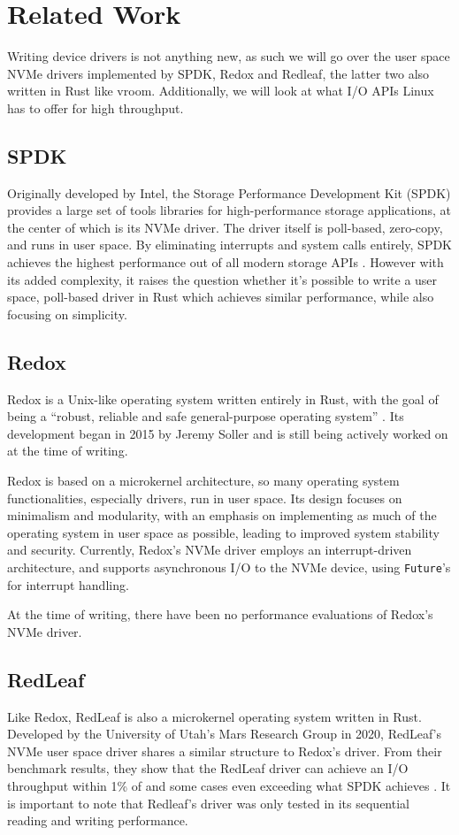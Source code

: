 \chapter{Related Work}\label{chapter:related}
Writing device drivers is not anything new, as such we will go over the user space NVMe drivers implemented by SPDK, Redox and Redleaf, the latter two also written in Rust like vroom. Additionally, we will look at what I/O APIs Linux has to offer for high throughput.

\section{SPDK}
Originally developed by Intel, the Storage Performance Development Kit (SPDK) provides a large set of tools libraries for high-performance storage applications, at the center of which is its NVMe driver. The driver itself is poll-based, zero-copy, and runs in user space. By eliminating interrupts and system calls entirely, SPDK achieves the highest performance out of all modern storage APIs \cite{storage_api}. However with its added complexity, it raises the question whether it's possible to write a user space, poll-based driver in Rust which achieves similar performance, while also focusing on simplicity.

\section{Redox}
Redox is a Unix-like operating system written entirely in Rust, with the goal of being a ``robust, reliable and safe general-purpose operating system'' \cite{redox}. Its development began in 2015 by Jeremy Soller and is still being actively worked on at the time of writing.

Redox is based on a microkernel architecture, so many operating system functionalities, especially drivers, run in user space. Its design focuses on minimalism and modularity, with an emphasis on implementing as much of the operating system in user space as possible, leading to improved system stability and security. Currently, Redox's NVMe driver employs an interrupt-driven architecture, and supports asynchronous I/O to the NVMe device, using \texttt{Future}'s for interrupt handling.

At the time of writing, there have been no performance evaluations of Redox's NVMe driver.

\section{RedLeaf}
Like Redox, RedLeaf \cite{redleaf-page} is also a microkernel operating system written in Rust. Developed by the University of Utah's Mars Research Group in 2020, RedLeaf's NVMe user space driver shares a similar structure to Redox's driver. From their benchmark results, they show that the RedLeaf driver can achieve an I/O throughput within 1\% of and some cases even exceeding what SPDK achieves \cite{redleaf}. It is important to note that Redleaf's driver was only tested in its sequential reading and writing performance.

